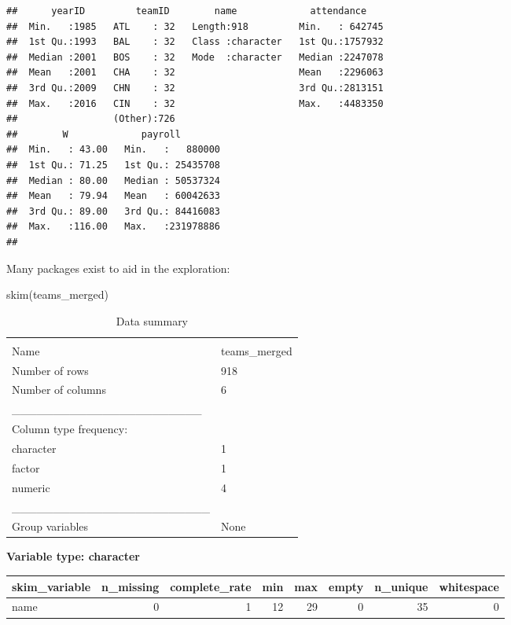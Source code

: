 \documentclass[
]{article}
\newenvironment{Shaded}{\begin{snugshade}}{\end{snugshade}}
\newcommand{\FunctionTok}[1]{\textcolor[rgb]{0.00,0.00,0.00}{#1}}
\newcommand{\NormalTok}[1]{#1}
\begin{document}
\begin{verbatim}
##      yearID         teamID        name             attendance     
##  Min.   :1985   ATL    : 32   Length:918         Min.   : 642745  
##  1st Qu.:1993   BAL    : 32   Class :character   1st Qu.:1757932  
##  Median :2001   BOS    : 32   Mode  :character   Median :2247078  
##  Mean   :2001   CHA    : 32                      Mean   :2296063  
##  3rd Qu.:2009   CHN    : 32                      3rd Qu.:2813151  
##  Max.   :2016   CIN    : 32                      Max.   :4483350  
##                 (Other):726                                       
##        W             payroll         
##  Min.   : 43.00   Min.   :   880000  
##  1st Qu.: 71.25   1st Qu.: 25435708  
##  Median : 80.00   Median : 50537324  
##  Mean   : 79.94   Mean   : 60042633  
##  3rd Qu.: 89.00   3rd Qu.: 84416083  
##  Max.   :116.00   Max.   :231978886  
## 
\end{verbatim}

Many packages exist to aid in the exploration:

\begin{Shaded}
\begin{Highlighting}[]
\FunctionTok{skim}\NormalTok{(teams\_merged)}
\end{Highlighting}
\end{Shaded}

\begin{longtable}[]{@{}ll@{}}
\caption{Data summary}\tabularnewline
\toprule
& \\
\midrule
\endfirsthead
\toprule
& \\
\midrule
\endhead
Name & teams\_merged \\
Number of rows & 918 \\
Number of columns & 6 \\
\_\_\_\_\_\_\_\_\_\_\_\_\_\_\_\_\_\_\_\_\_\_\_ & \\
Column type frequency: & \\
character & 1 \\
factor & 1 \\
numeric & 4 \\
\_\_\_\_\_\_\_\_\_\_\_\_\_\_\_\_\_\_\_\_\_\_\_\_ & \\
Group variables & None \\
\bottomrule
\end{longtable}

\textbf{Variable type: character}

\begin{longtable}[]{@{}lrrrrrrr@{}}
\toprule
skim\_variable & n\_missing & complete\_rate & min & max & empty &
n\_unique & whitespace \\
\midrule
\endhead
name & 0 & 1 & 12 & 29 & 0 & 35 & 0 \\
\bottomrule
\end{longtable}
\end{document}
